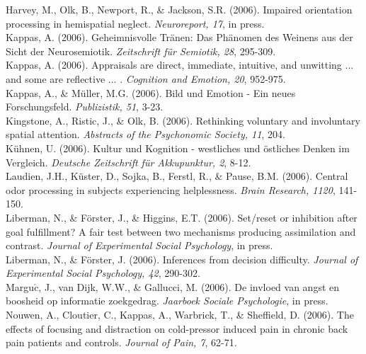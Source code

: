 Harvey, M., Olk, B., Newport, R., \& Jackson, S.R. (2006). Impaired orientation processing in hemispatial neglect. \textit{Neuroreport, 17}, in press.\\ 

Kappas, A. (2006). Geheimnisvolle Tr\"{a}nen: Das Ph\"{a}nomen des Weinens aus der Sicht der Neurosemiotik. \textit{Zeitschrift f\"{u}r Semiotik, 28}, 295-309.\\ 

Kappas, A. (2006). Appraisals are direct, immediate, intuitive, and unwitting ... and some are reflective ... . \textit{Cognition and Emotion, 20}, 952-975.\\ 

Kappas, A., \& M\"{u}ller, M.G. (2006). Bild und Emotion - Ein neues Forschungsfeld. \textit{Publizistik, 51}, 3-23.\\ 

Kingstone, A., Ristic, J., \& Olk, B. (2006). Rethinking voluntary and involuntary spatial attention. \textit{Abstracts of the Psychonomic Society, 11}, 204.\\ 

K\"{u}hnen, U. (2006). Kultur und Kognition - westliches und \"{o}stliches Denken im Vergleich. \textit{Deutsche Zeitschrift f\"{u}r Akkupunktur, 2}, 8-12.\\ 

Laudien, J.H., K\"{u}ster, D., Sojka, B., Ferstl, R., \& Pause, B.M. (2006). Central odor processing in subjects experiencing helplessness. \textit{Brain Research, 1120}, 141-150.\\ 

Liberman, N., \& F\"{o}rster, J., \& Higgins, E.T. (2006). Set/reset or inhibition after goal fulfillment? A fair test between two mechanisms producing assimilation and contrast. \textit{Journal of Experimental Social Psychology}, in press.\\ 

Liberman, N., \& F\"{o}rster, J. (2006). Inferences from decision difficulty. \textit{Journal of Experimental Social Psychology, 42}, 290-302.\\ 


Margu$\acute{\mbox{c}}$, J., van Dijk, W.W., \& Gallucci, M. (2006). De invloed van angst en boosheid op informatie zoekgedrag. \textit{Jaarboek Sociale Psychologie}, in press.\\ 

Nouwen, A., Cloutier, C., Kappas, A., Warbrick, T., \& Sheffield, D. (2006). The effects of focusing and distraction on cold-pressor induced pain in chronic back pain patients and controls. \textit{Journal of Pain, 7}, 62-71.\\ 

